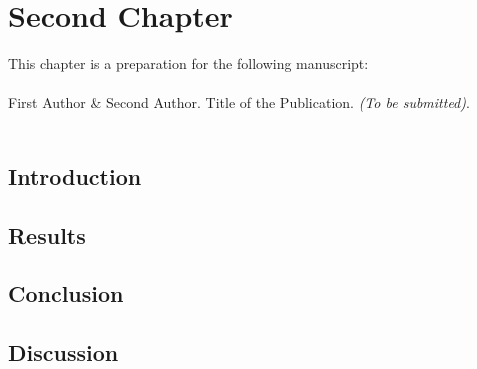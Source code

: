 \chapter{Second Chapter}
\label{chapter:second-chapter}

\vspace{3cm}

This chapter is a preparation for the following manuscript:\\
\\
First Author \& 
Second Author. Title of the Publication. \textit{(To be submitted)}.\\
\\

\clearpage

\section{Introduction}
\lipsum[1-10]

\section{Results}
\lipsum[1-10]

\section{Conclusion}
\lipsum[1-10]

\section{Discussion}
\lipsum[1-10]

